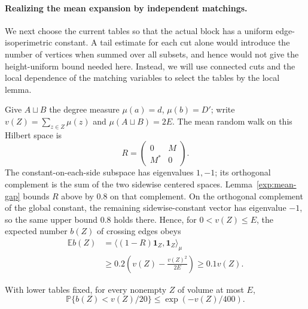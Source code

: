\paragraph{Realizing the mean expansion by independent matchings.}
We next choose the current tables so that the actual block has a
uniform edge-isoperimetric constant. A tail estimate for each cut alone
would introduce the number of vertices when summed over all subsets,
and hence would not give the height-uniform bound needed here. Instead,
we will use connected cuts and the local dependence of the matching
variables to select the tables by the local lemma.

Give $A\sqcup B$ the degree measure $\mu(a)=d$, $\mu(b)=D'$;
write $v(Z)=\sum_{z\in Z}\mu(z)$ and
$\mu(A\sqcup B)=2E$. The mean random walk on this Hilbert space is
\[
 R=\begin{pmatrix}0&M\\M^*&0\end{pmatrix}.
\]
The constant-on-each-side subspace has eigenvalues $1,-1$;
its orthogonal complement is the sum of the two sidewise centered
spaces. Lemma~\ref{exp:mean-gap} bounds $R$ above by $0.8$ on
that complement. On the orthogonal complement of the global
constant, the remaining sidewise-constant vector has eigenvalue
$-1$, so the same upper bound $0.8$ holds there. Hence, for
$0<v(Z)\leq E$, the expected number $b(Z)$ of crossing edges obeys
\begin{align}
 \mathbb E b(Z)
 &=\langle(1-R)\mathbf1_Z,\mathbf1_Z\rangle_{\mu}\\
 &\geq0.2\left(v(Z)-\frac{v(Z)^2}{2E}\right)
 \geq0.1v(Z).
 \label{exp:mean-cut}
\end{align}

\begin{lemma}\label{exp:cut-tail}
With lower tables fixed, for every nonempty $Z$ of volume at most
$E$,
\[
 \mathbb P\{b(Z)<v(Z)/20\}\leq\exp(-v(Z)/400).
\]
\end{lemma}

